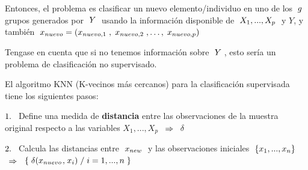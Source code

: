 \documentclass[
  11pt,
  a4paper,
]{article}
\begin{document}
Entonces, el problema es clasificar un nuevo elemento/individuo en uno
de los \(\hspace{0.1cm} g \hspace{0.1cm}\) grupos generados por
\(\hspace{0.1cm} Y \hspace{0.1cm}\) usando la información disponible de
\(\hspace{0.1cm} X_1,...,X_p \hspace{0.1cm}\) y \(Y\), y también
\(\hspace{0.1cm} x_{nuevo} = (x_{nuevo,1 }\hspace{0.1cm},\hspace{0.1cm}x_{nuevo,2}\hspace{0.1cm},\dots,\hspace{0.1cm}x_{nuevo,p}) \hspace{0.1cm}\)

Tengase en cuenta que si no tenemos información sobre
\(\hspace{0.1cm} Y \hspace{0.1cm}\), esto sería un problema de
clasificación no supervisado.

\vspace{0.3cm}

El algoritmo KNN (K-vecinos más cercanos) para la clasificación
supervisada tiene los siguientes pasos:

\vspace{0.2cm}

\(1. \hspace{0.15cm}\) Define una medida de \textbf{distancia} entre las
observaciones de la muestra original respecto a las variables
\(X_1,...,X_p\) \(\hspace{0.15cm} \Rightarrow \hspace{0.15cm}\)
\(\delta\)

\vspace{0.2cm}

\(2. \hspace{0.15cm}\) Calcula las distancias entre
\(\hspace{0.1 cm}x_{new}\hspace{0.1 cm}\) y las observaciones iniciales
\(\hspace{0.1cm} \lbrace x_1,...,x_n \rbrace\)
\(\hspace{0.15cm} \Rightarrow \hspace{0.15cm}\)
\(\lbrace \hspace{0.1 cm} \delta(x_{nuevo}\hspace{0.03 cm},\hspace{0.03 cm} x_i) \hspace{0.1 cm} / \hspace{0.1 cm} i=1,...,n \hspace{0.1 cm} \rbrace\)
\end{document}
